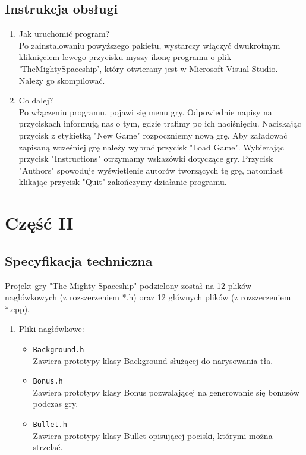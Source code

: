 \documentclass{article}
\begin{document}
\begin{normalsize}
	\subsection*{Instrukcja obsługi}
		\begin{enumerate}
			\item Jak uruchomić program?\\
			Po zainstalowaniu powyższego pakietu, wystarczy włączyć dwukrotnym kliknięciem lewego przycisku myszy ikonę programu o plik 'TheMightySpaceship', który otwierany jest w Microsoft Visual Studio. Należy go skompilować.
			\item Co dalej?\\
			Po włączeniu programu, pojawi się menu gry. Odpowiednie napisy na przyciskach informują nas o tym, gdzie trafimy po ich naciśnięciu. Naciskając przycisk z etykietką "New Game" rozpoczniemy nową grę. Aby załadować zapisaną wcześniej grę należy wybrać przycisk "Load Game". Wybierając przycisk "Instructions" otrzymamy wskazówki dotyczące gry. Przycisk "Authors" spowoduje wyświetlenie autorów tworzących tę grę, natomiast klikając przycisk "Quit" zakończymy działanie programu.
		\end{enumerate}
		
\newpage		
		
\section*{Część II}
	\subsection*{Specyfikacja techniczna}
	Projekt gry "The Mighty Spaceship" podzielony został na 12 plików nagłówkowych (z rozszerzeniem *.h) oraz 12 głównych plików (z rozszerzeniem *.cpp).
	\begin{enumerate}
		\item Pliki nagłówkowe:
			\begin{itemize}
			
				\item \verb;Background.h;\\
				Zawiera prototypy klasy Background służącej do narysowania tła.
				
				\item \verb;Bonus.h;\\
				Zawiera prototypy klasy Bonus pozwalającej na generowanie się bonusów podczas gry.
				
				\item \verb;Bullet.h;\\
				Zawiera prototypy klasy Bullet opisującej pociski, którymi można strzelać.
				

\end{itemize}
\end{enumerate}
\end{normalsize}
\end{document}
